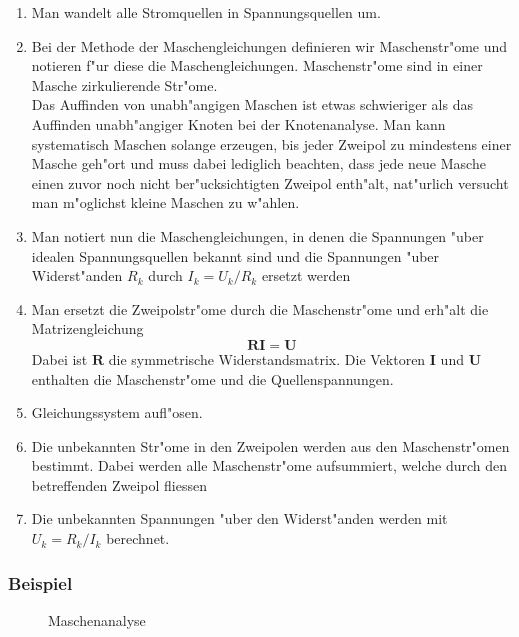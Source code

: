 \documentclass[german, 10pt, a4paper, headsepline]{scrreprt}
\theoremstyle{remark}
\begin{document}
\begin{enumerate}
	\item Man wandelt alle Stromquellen in Spannungsquellen um.
	\item Bei der Methode der Maschengleichungen definieren wir Maschenstr"ome und notieren f"ur diese die Maschengleichungen. Maschenstr"ome sind in einer Masche zirkulierende Str"ome.\\
	Das Auffinden von unabh"angigen Maschen ist etwas schwieriger als das Auffinden unabh"angiger Knoten bei der Knotenanalyse. Man kann systematisch Maschen solange erzeugen, bis jeder Zweipol zu mindestens einer Masche geh"ort und muss dabei lediglich beachten, dass jede neue Masche einen zuvor noch nicht ber"ucksichtigten Zweipol enth"alt, nat"urlich versucht man m"oglichst kleine Maschen zu w"ahlen.
	\item Man notiert nun die Maschengleichungen, in denen die Spannungen "uber idealen Spannungsquellen bekannt sind und die Spannungen "uber Widerst"anden $R_k$ durch $I_k=U_k/R_k$ ersetzt werden
	\item Man ersetzt die Zweipolstr"ome durch die Maschenstr"ome und erh"alt die Matrizengleichung
		\begin{displaymath}
			\mathbf{R}\mathbf{I}=\mathbf{U}
		\end{displaymath}
	Dabei ist $\mathbf{R}$ die symmetrische Widerstandsmatrix. Die Vektoren $\mathbf{I}$ und $\mathbf{U}$ enthalten die Maschenstr"ome und die Quellenspannungen.
	\item Gleichungssystem aufl"osen.
	\item Die unbekannten Str"ome in den Zweipolen werden aus den Maschenstr"omen bestimmt. Dabei werden alle Maschenstr"ome aufsummiert, welche durch den betreffenden Zweipol fliessen
	\item Die unbekannten Spannungen "uber den Widerst"anden werden mit $U_k=R_k/I_k$ berechnet.
\end{enumerate}

\subsubsection{Beispiel}

\begin{figure}[hbt]
 
 \centerline{\box\graph}
 \caption{Maschenanalyse}
 \label{maschenanalyse_fig}
\end{figure}
\end{document}
